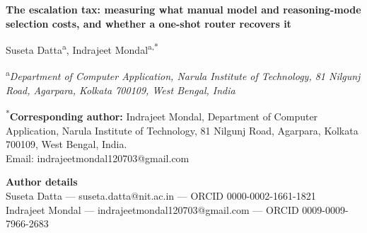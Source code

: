 \documentclass[11pt]{article}
\begin{document}
\begin{center}
{\Large\bfseries The escalation tax: measuring what manual model and
reasoning-mode selection costs, and whether a one-shot router recovers it\par}
\bigskip

{\large Suseta Datta\textsuperscript{a}, Indrajeet
Mondal\textsuperscript{a,*}\par}
\medskip

\textsuperscript{a}\emph{Department of Computer Application, Narula Institute
of Technology, 81 Nilgunj Road, Agarpara, Kolkata 700109, West Bengal,
India}
\end{center}

\bigskip

\textsuperscript{*}\textbf{Corresponding author:} Indrajeet Mondal,
Department of Computer Application, Narula Institute of Technology, 81
Nilgunj Road, Agarpara, Kolkata 700109, West Bengal, India.\\
Email: indrajeetmondal120703@gmail.com

\textbf{Author details}\\
Suseta Datta --- suseta.datta@nit.ac.in --- ORCID 0000-0002-1661-1821\\
Indrajeet Mondal --- indrajeetmondal120703@gmail.com --- ORCID
0009-0009-7966-2683


\end{document}
